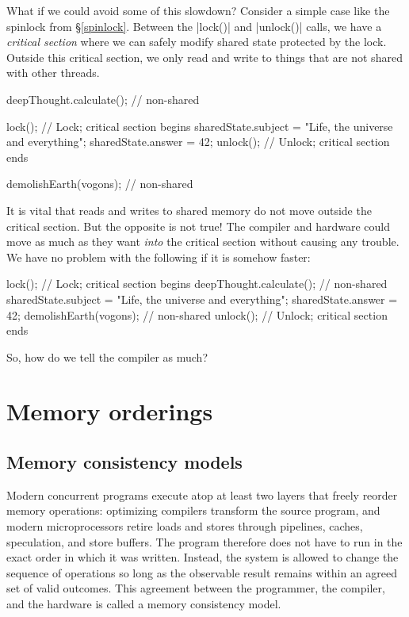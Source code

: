 \documentclass[fontsize=10pt, oneside]{scrartcl}
\newcommand{\introduce}[1]{\textit{#1}}
\newcommand{\secref}[1]{\hyperref[#1]{\textsc{\S}\ref*{#1}}}
\begin{document}
What if we could avoid some of this slowdown?
Consider a simple case like the spinlock from \secref{spinlock}.
Between the \cc|lock()| and \cc|unlock()| calls,
we have a \introduce{critical section} where we can safely modify shared state protected by the lock.
Outside this critical section,
we only read and write to things that are not shared with other threads.
\begin{cppcode}
deepThought.calculate(); // non-shared

lock(); // Lock; critical section begins
sharedState.subject = "Life, the universe and everything";
sharedState.answer = 42;
unlock(); // Unlock; critical section ends

demolishEarth(vogons); // non-shared
\end{cppcode}

It is vital that reads and writes to shared memory do not move outside the critical section.
But the opposite is not true!
The compiler and hardware could move as much as they want \emph{into} the critical section without causing any trouble.
We have no problem with the following if it is somehow faster:
\begin{cppcode}
lock(); // Lock; critical section begins
deepThought.calculate(); // non-shared
sharedState.subject = "Life, the universe and everything";
sharedState.answer = 42;
demolishEarth(vogons); // non-shared
unlock(); // Unlock; critical section ends
\end{cppcode}
So, how do we tell the compiler as much?

\section{Memory orderings}

\subsection{Memory consistency models}

Modern concurrent programs execute atop at least two layers that freely reorder memory operations:
optimizing compilers transform the source program, and modern microprocessors retire loads and stores through pipelines, caches, speculation, and store buffers.
The program therefore does not have to run in the exact order in which it was written.
Instead, the system is allowed to change the sequence of operations so long as the observable result remains within an agreed set of valid outcomes.
This agreement between the programmer, the compiler, and the hardware is called a memory consistency model.
\end{document}
